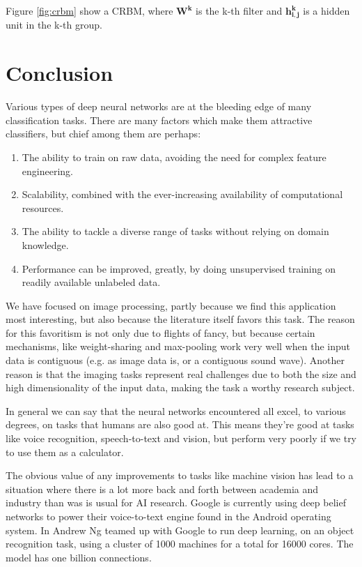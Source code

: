 \documentclass[11pt]{article}
\begin{document}
\newpage

Figure \ref{fig:crbm} show a CRBM, where $\mathbf{W^k}$ is the k-th filter and $\mathbf{h^k_{i,j}}$ is a hidden unit in the k-th group.
\section{Conclusion}

Various types of deep neural networks are at the bleeding edge of many classification tasks.  There are many factors which make them attractive classifiers, but chief among them are perhaps:
\begin{enumerate}
\item The ability to train on raw data, avoiding the need for complex feature engineering.
\item Scalability, combined with the ever-increasing availability of computational resources.
\item The ability to tackle a diverse range of tasks without relying on domain knowledge.
\item Performance can be improved, greatly, by doing unsupervised training on readily available unlabeled data.
\end{enumerate}

We have focused on image processing, partly because we find this application most interesting, but also because the literature itself favors this task.  The reason for this favoritism is not only due to flights of fancy, but because certain mechanisms, like weight-sharing and max-pooling work very well when the input data is contiguous (e.g. as image data is, or a contiguous sound wave).  Another reason is that the imaging tasks represent real challenges due to both the size and high dimensionality of the input data, making the task a worthy research subject.

In general we can say that the neural networks encountered all excel, to various degrees, on tasks that humans are also good at.  This means they're good at tasks like voice recognition, speech-to-text and vision, but perform very poorly if we try to use them as a calculator.

The obvious value of any improvements to tasks like machine vision has lead to a situation where there is a lot more back and forth between academia and industry than was is usual for AI research.  Google is currently using deep belief networks to power their voice-to-text engine found in the Android operating system.  In \cite{ng} Andrew Ng teamed up with Google to run deep learning, on an object recognition task, using a cluster of 1000 machines for a total for 16000 cores.  The model has one billion connections.
\end{document}
